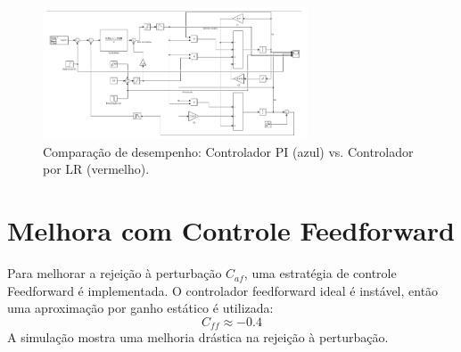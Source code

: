 \documentclass[a4paper,12pt]{report}
\begin{document}
\begin{figure}[H]
    \centering
    \includegraphics[width=0.7\textwidth]{"Trabalho 2 Sistemas de Controle/image1.png"}
    \caption{Comparação de desempenho: Controlador PI (azul) vs. Controlador por LR (vermelho).}
\end{figure}

\section{Melhora com Controle Feedforward}
Para melhorar a rejeição à perturbação \(C_{af}\), uma estratégia de controle Feedforward é implementada. O controlador feedforward ideal é instável, então uma aproximação por ganho estático é utilizada:
\begin{equation}
C_{ff} \approx -0.4
\end{equation}
A simulação mostra uma melhoria drástica na rejeição à perturbação.
\end{document}

